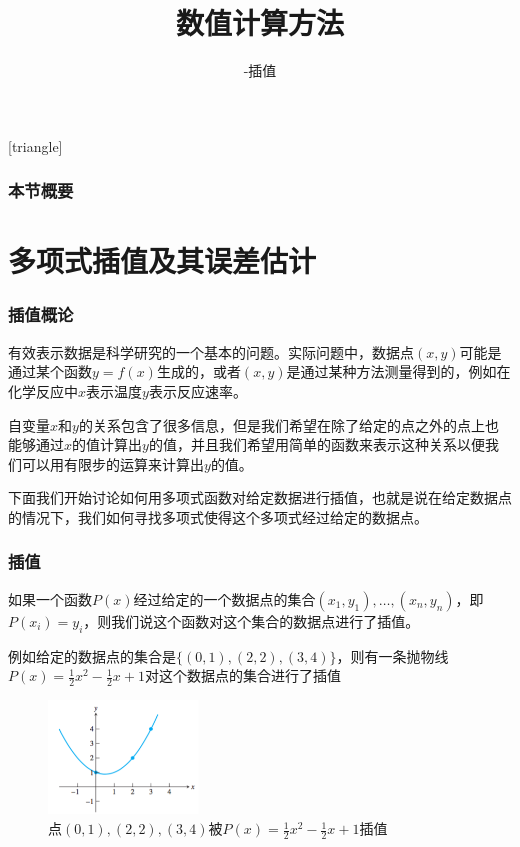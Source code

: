 \documentclass[10pt]{beamer}
\title[数值计算方法]{数值计算方法}
\subtitle{-插值}
\begin{document}
[triangle]

\begin{frame}
\titlepage
\end{frame}


\begin{frame}
  \frametitle{本节概要}
  \tableofcontents%
\end{frame}


\section{多项式插值及其误差估计}

\begin{frame}
\frametitle{插值概论}
有效表示数据是科学研究的一个基本的问题。实际问题中，数据点$(x,y)$可能是通过某个函数$y = f(x)$生成的，或者$(x,y)$是通过某种方法测量得到的，例如在化学反应中$x$表示温度$y$表示反应速率。

\vspace{0.2cm}

自变量$x$和$y$的关系包含了很多信息，但是我们希望在除了给定的点之外的点上也能够通过$x$的值计算出$y$的值，并且我们希望用简单的函数来表示这种关系以便我们可以用有限步的运算来计算出$y$的值。

\vspace{0.2cm}

下面我们开始讨论如何用多项式函数对给定数据进行插值，也就是说在给定数据点的情况下，我们如何寻找多项式使得这个多项式经过给定的数据点。


\end{frame}

\begin{frame}
\frametitle{插值}
\begin{definition}[插值]
如果一个函数$P(x)$经过给定的一个数据点的集合$(x_1, y_1), \ldots, (x_n,y_n)$，即$P(x_i) = y_i$，则我们说这个函数对这个集合的数据点进行了插值。
\end{definition}
例如给定的数据点的集合是$\{(0,1),(2,2),(3,4)\}$，则有一条抛物线$P(x) = \frac{1}{2}x^2 - \frac{1}{2}x+ 1$对这个数据点的集合进行了插值
\begin{figure}
\includegraphics[width=4cm]{figs/3_1_Interp-1} 
\caption{点$(0,1),(2,2),(3,4)$被$P(x) = \frac{1}{2}x^2 - \frac{1}{2}x+ 1$插值} 
\end{figure}
\end{frame}
\end{document}
